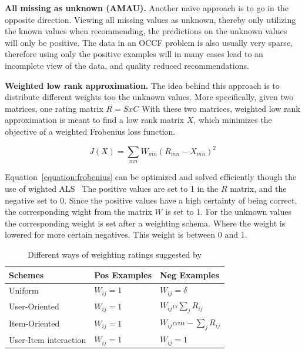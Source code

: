 \textbf{All missing as unknown (AMAU).}
Another naive approach is to go in the opposite direction.
Viewing all missing values as unknown, thereby only utilizing the known values when recommending, the predictions on the unknown values will only be positive.
The data in an OCCF problem is also usually very sparse, therefore using only the positive examples will in many cases lead to an incomplete view of the data, and quality reduced recommendations.

\textbf{Weighted low rank approximation.} %
The idea behind this approach is to distribute different weights too the unknown values.
More specifically, given two matrices, one rating matrix $R = SxC$ %
With these two matrices, weighted low rank approximation is meant to find a low rank matrix $X$, which minimizes the objective of a weighted Frobenius loss function. %

\begin{equation}
J(X) = \sum_{mn} W_{mn}(R_{mn} - X_{mn})^2
\label{equation:frobenius}
\end{equation}

Equation~\ref{equation:frobenius} can be optimized and solved efficiently though the use of wighted ALS~%
The positive values are set to 1 in the $R$ matrix, and the negative set to 0.
Since the positive values have a high certainty of being correct, the corresponding wight from the matrix $W$ is set to 1.
For the unknown values the corresponding weight is set after a weighting schema.
Where the weight is lowered for more certain negatives.
This weight is between 0 and 1.

\begin{table}[H]
    \centering
    \begin{tabular}{l|l|l}
      \textbf{Schemes}      & \textbf{Pos Examples} & \textbf{Neg Examples} \\ \hline
      Uniform               & $W_{ij} = 1$ & $W_{ij} = δ$ \\ \hline
      User-Oriented         & $W_{ij} = 1$ & $W_{ij} \alpha \sum_{j} R_{ij}$ \\ \hline
      Item-Oriented         & $W_{ij} = 1$ & $W_{ij} \alpha m - \sum_{j} R_{ij}$ \\ \hline
      User-Item interaction & $W_{ij} = 1$ & $W_{ij} = 1$  \\
    \end{tabular}
    \label{table:WeightingSchemes}
    \caption[Weighting Schemes]{Different ways of weighting ratings suggested by}
\end{table}

